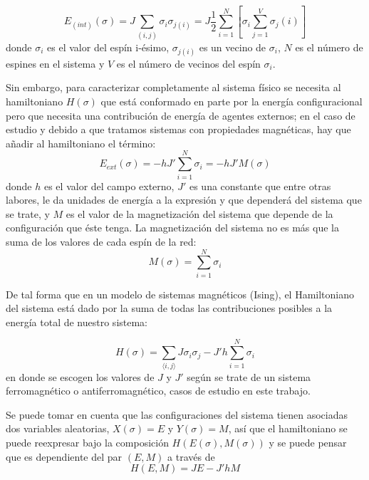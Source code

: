 \documentclass[12pt]{book}
\begin{document}
\begin{equation}
E_{(int)}(\sigma) = J \sum_{(i,j)} \sigma_{i}\sigma_{j(i)}=J\frac{1}{2} \sum \limits_{i=1}^{N}\left[ \sigma_{i}\sum_{j=1}^{V} \sigma_{j}(i)\right]
\end{equation}
donde $\sigma_{i}$ es el valor del espín i-ésimo, $\sigma_{j(i)}$ es un vecino de $\sigma_{i}$,   $N$ es el número de espines en el sistema y $V$ es el número de vecinos del espín $\sigma_{i}$.

Sin embargo, para caracterizar completamente al sistema físico se necesita al hamiltoniano $H(\sigma)$ que está conformado en parte por la energía configuracional pero que necesita una contribución de energía  de agentes externos; en el caso de estudio y debido a que tratamos sistemas con propiedades magnéticas, hay que añadir al hamiltoniano el término:
 \begin{equation}
  E_{ext}(\sigma)= -h J'\sum_{i=1}^N \sigma_i = -h J' M(\sigma)
 \end{equation}
 donde $h$ es el valor del campo externo, $J'$ es una constante que entre otras labores, le da unidades de energía a la expresión y que dependerá del sistema que se trate, y $M$ es el valor de la magnetización del sistema que depende de la configuración que éste tenga. La magnetización del sistema no es más que la suma de los valores de cada espín de la red:
 \begin{equation}
 	M(\sigma) = \sum \limits_{i=1}^{N}\sigma_{i}
 \end{equation}

De tal forma que en un modelo de sistemas magnéticos (Ising), el Hamiltoniano del sistema está dado por la suma de todas las contribuciones posibles a la energía total de nuestro sistema:

\begin{equation}
 H(\sigma) = \sum_{\langle i,j\rangle} J\sigma_i \sigma_j - J'h\sum_{i=1}^N \sigma_i
\end{equation}
en donde se escogen los valores de $J$ y $J'$ según se trate de un sistema ferromagnético o antiferromagnético, casos de estudio en este trabajo. 

Se puede tomar en cuenta que las configuraciones del sistema tienen asociadas dos variables aleatorias, $X(\sigma)=E$ y $Y(\sigma)=M$, así que el hamiltoniano se puede reexpresar bajo la composición $H(E(\sigma),M(\sigma))$ y se puede pensar que es dependiente del par $(E,M)$ a través de
\begin{equation}
 H(E,M) = J E - J' h M
\end{equation}
\end{document}
